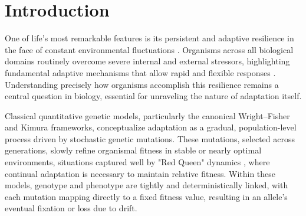\documentclass[aps,pre,twocolumn,floatfix,nofootinbib,amsmath,amssymb]{revtex4-2}
\begin{document}
\maketitle


\section{Introduction}

One of life's most remarkable features is its persistent and adaptive resilience in the face of constant environmental fluctuations \citep{shaw_rapid_2012,messer_can_2016,messer_population_2013}. Organisms across all biological domains routinely overcome severe internal and external stressors, highlighting fundamental adaptive mechanisms that allow rapid and flexible responses \citep{blake_noise_2003,coomer_noise_2022}. Understanding precisely how organisms accomplish this resilience remains a central question in biology, essential for unraveling the nature of adaptation itself.

Classical quantitative genetic models, particularly the canonical Wright–Fisher \citep{tataru_statistical_2017} and Kimura \citep{kimura_model_1979} frameworks, conceptualize adaptation as a gradual, population-level process driven by stochastic genetic mutations. These mutations, selected across generations, slowly refine organismal fitness in stable or nearly optimal environments, situations captured well by "Red Queen" dynamics \citep{sole_revisiting_2022,khibnik_three_1997,van_valen_new_1973}, where continual adaptation is necessary to maintain relative fitness. Within these models, genotype and phenotype are tightly and deterministically linked, with each mutation mapping directly to a fixed fitness value, resulting in an allele's eventual fixation or loss due to drift.
\end{document}
